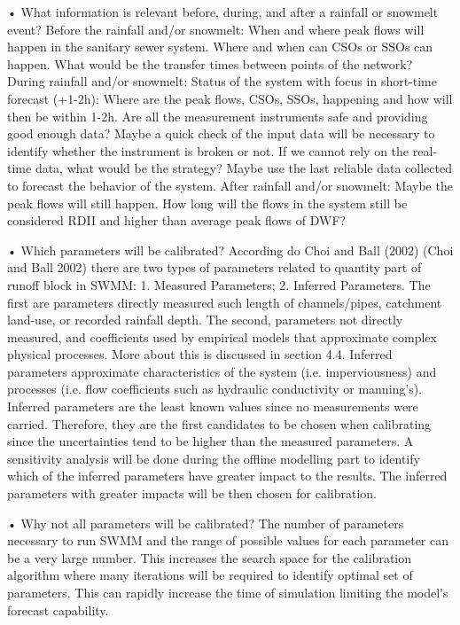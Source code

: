 •	What information is relevant before, during, and after a rainfall or snowmelt event?
Before the rainfall and/or snowmelt: When and where peak flows will happen in the sanitary sewer system. Where and when can CSOs or SSOs can happen. What would be the transfer times between points of the network? During rainfall and/or snowmelt: Status of the system with focus in short-time forecast (+1-2h): Where are the peak flows, CSOs, SSOs, happening and how will then be within 1-2h. Are all the measurement instruments safe and providing good enough data? Maybe a quick check of the input data will be necessary to identify whether the instrument is broken or not. If we cannot rely on the real-time data, what would be the strategy? Maybe use the last reliable data collected to forecast the behavior of the system. After rainfall and/or snowmelt:  Maybe the peak flows will still happen. How long will the flows in the system still be considered RDII and higher than average peak flows of DWF? 

•	Which parameters will be calibrated? According do Choi and Ball (2002) (Choi and Ball 2002) there are two types of parameters related to quantity part of runoff block in SWMM: 1. Measured Parameters; 2. Inferred Parameters. The first are parameters directly measured such length of channels/pipes, catchment land-use, or recorded rainfall depth. The second, parameters not directly measured, and coefficients used by empirical models that approximate complex physical processes. More about this is discussed in section 4.4. Inferred parameters approximate characteristics of the system (i.e. imperviousness) and processes (i.e. flow coefficients such as hydraulic conductivity or manning’s). Inferred parameters are the least known values since no measurements were carried. Therefore, they are the first candidates to be chosen when calibrating since the uncertainties tend to be higher than the measured parameters. A sensitivity analysis will be done during the offline modelling part to identify which of the inferred parameters have greater impact to the results. The inferred parameters with greater impacts will be then chosen for calibration. 

•	Why not all parameters will be calibrated? The number of parameters necessary to run SWMM and the range of possible values for each parameter can be a very large number. This increases the search space for the calibration algorithm where many iterations will be required to identify optimal set of parameters. This can rapidly increase the time of simulation limiting the model’s forecast capability.

